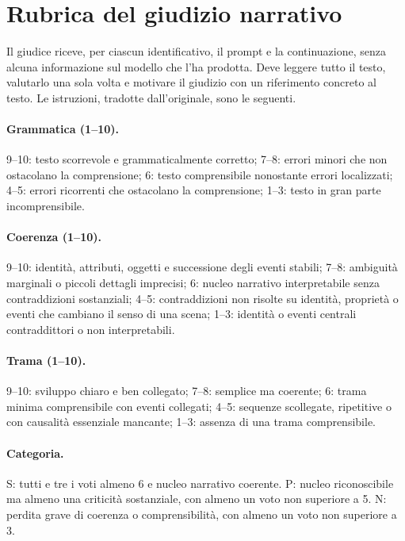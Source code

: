 \section{Rubrica del giudizio narrativo}
\label{sec:appendice-rubrica}

Il giudice riceve, per ciascun identificativo, il prompt e la continuazione, senza alcuna informazione sul modello che l'ha prodotta. Deve leggere tutto il testo, valutarlo una sola volta e motivare il giudizio con un riferimento concreto al testo. Le istruzioni, tradotte dall'originale, sono le seguenti.

\paragraph{Grammatica (1--10).} 9--10: testo scorrevole e grammaticalmente corretto; 7--8: errori minori che non ostacolano la comprensione; 6: testo comprensibile nonostante errori localizzati; 4--5: errori ricorrenti che ostacolano la comprensione; 1--3: testo in gran parte incomprensibile.

\paragraph{Coerenza (1--10).} 9--10: identità, attributi, oggetti e successione degli eventi stabili; 7--8: ambiguità marginali o piccoli dettagli imprecisi; 6: nucleo narrativo interpretabile senza contraddizioni sostanziali; 4--5: contraddizioni non risolte su identità, proprietà o eventi che cambiano il senso di una scena; 1--3: identità o eventi centrali contraddittori o non interpretabili.

\paragraph{Trama (1--10).} 9--10: sviluppo chiaro e ben collegato; 7--8: semplice ma coerente; 6: trama minima comprensibile con eventi collegati; 4--5: sequenze scollegate, ripetitive o con causalità essenziale mancante; 1--3: assenza di una trama comprensibile.

\paragraph{Categoria.} S: tutti e tre i voti almeno 6 e nucleo narrativo coerente. P: nucleo riconoscibile ma almeno una criticità sostanziale, con almeno un voto non superiore a 5. N: perdita grave di coerenza o comprensibilità, con almeno un voto non superiore a 3.

